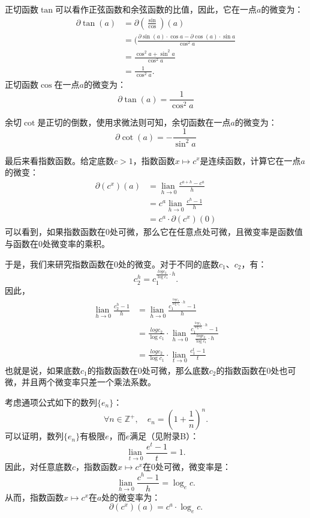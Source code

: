 \documentclass[12pt,UTF8]{ctexbook}
\newcommand{\lian}[1]{
    \underset{#1}{\operatorname{lian}\,}
}
\begin{document}
正切函数$\tan$可以看作正弦函数和余弦函数的比值，因此，它在一点$a$的微变为：
\begin{align*}
    \partial \tan(a) &= \partial \left(\frac{\sin}{\cos}\right)(a)  \\
    &= (\frac{\partial \sin(a) \cdot \cos{a} - \partial \cos(a) \cdot \sin{a}}{\cos^2{a}}  \\
    &= \frac{\cos^2{a} + \sin^2{a}}{\cos^2{a}}  \\
    &= \frac{1}{\cos^2{a}}.  
\end{align*}
正切函数$\cos$在一点$a$的微变为：
$$ \partial \tan(a) = \frac{1}{\cos^2{a}} $$

余切$\cot$是正切的倒数，使用求微法则可知，余切函数在一点$a$的微变为：
$$ \partial \cot(a) = -\frac{1}{\sin^2{a}} $$

最后来看指数函数。给定底数$c > 1$，指数函数$x\mapsto c^x$是连续函数，计算它在一点$a$的微变：
\begin{align*}
    \partial (c^x) (a) &= \lian{h\to 0} \frac{c^{a+h} - c^a}{h}  \\
    &= c^a \lian{h\to 0} \frac{c^h - 1}{h}  \\
    &= c^a \cdot \partial (c^x) (0) 
\end{align*}
可以看到，如果指数函数在$0$处可微，那么它在任意点处可微，且微变率是函数值与函数在$0$处微变率的乘积。

于是，我们来研究指数函数在$0$处的微变。对于不同的底数$c_1$、$c_2$，有：
$$c_2^h = c_1^{\frac{log{c_2}}{\log{c_1}}\cdot h}.$$
因此，
\begin{align*}
    \lian{h\to 0} \frac{c_2^h - 1}{h} &= \lian{h\to 0} \frac{c_1^{\frac{log{c_2}}{\log{c_1}}\cdot h} - 1}{h}  \\
    &= \frac{log{c_2}}{\log{c_1}} \cdot \lian{h\to 0} \frac{c_1^{\frac{log{c_2}}{\log{c_1}}\cdot h} - 1}{\frac{log{c_2}}{\log{c_1}} \cdot h}  \\
    &= \frac{log{c_2}}{\log{c_1}} \cdot \lian{t\to 0} \frac{c_1^{t} - 1}{t}  
\end{align*}
也就是说，如果底数$c_1$的指数函数在$0$处可微，那么底数$c_2$的指数函数在$0$处也可微，并且两个微变率只差一个乘法系数。

考虑通项公式如下的数列$\{e_n\}$：
$$ \forall n\in\mathbb{Z}^+,\quad e_n = \left(1 + \frac{1}{n}\right)^n.$$
可以证明，数列$\{e_n\}$有极限$e$，而$e$满足（见附录B）：
$$ \lian{t\to 0} \frac{e^{t} - 1}{t} = 1.$$
因此，对任意底数$c$，指数函数$x\mapsto c^x$在$0$处可微，微变率是：
$$ \lian{h\to 0} \frac{c^h - 1}{h} = \log_e{c}.$$
从而，指数函数$x\mapsto c^x$在$a$处的微变率为：
$$ \partial (c^x) (a) = c^a \cdot \log_e{c}. $$
\end{document}
